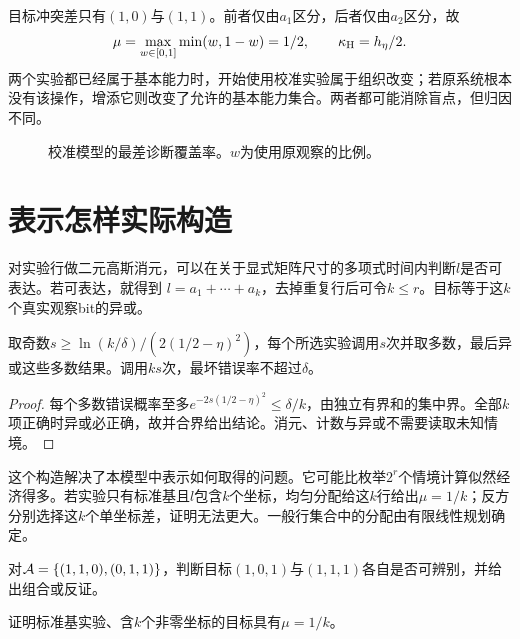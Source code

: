 目标冲突差只有$(1,0)$与$(1,1)$。前者仅由$a_1$区分，后者仅由$a_2$区分，故
\[
 \mu=\max_{w\in[0,1]}\min(w,1-w)=1/2,
 \qquad \kappa_{\mathrm H}=h_\eta/2.
\]
两个实验都已经属于基本能力时，开始使用校准实验属于组织改变；若原系统根本没有该操作，增添它则改变了允许的基本能力集合。两者都可能消除盲点，但归因不同。

\begin{figure}[ht]
\centering
{}
\caption{校准模型的最差诊断覆盖率。$w$为使用原观察的比例。}
\end{figure}

\begin{table}[ht]
\centering

\caption{校准模型在$\delta=0.05$下的解析预算界。下界约束所有策略，上界由公开随机分配实现；二者不表示有限参数下已经达到精确最优。}
\label{tab:calibration}
\end{table}

\section{表示怎样实际构造}
对实验行做二元高斯消元，可以在关于显式矩阵尺寸的多项式时间内判断$l$是否可表达。若可表达，就得到
$l=a_1+\cdots+a_k$，去掉重复行后可令$k\le r$。目标等于这$k$个真实观察bit的异或。

\begin{proposition}[已构造线性表示的可靠执行]
\label{prop:parity-execute}
取奇数$s\ge\ln(k/\delta)/(2(1/2-\eta)^2)$，每个所选实验调用$s$次并取多数，最后异或这些多数结果。调用$ks$次，最坏错误率不超过$\delta$。
\end{proposition}
\begin{proof}
每个多数错误概率至多$e^{-2s(1/2-\eta)^2}\le\delta/k$，由独立有界和的集中界。全部$k$项正确时异或必正确，故并合界给出结论。消元、计数与异或不需要读取未知情境。
\end{proof}

这个构造解决了本模型中表示如何取得的问题。它可能比枚举$2^r$个情境计算似然经济得多。若实验只有标准基且$l$包含$k$个坐标，均匀分配给这$k$行给出$\mu=1/k$；反方分别选择这$k$个单坐标差，证明无法更大。一般行集合中的分配由有限线性规划确定。

\begin{exercise}对$\mathcal A=\{(1,1,0),(0,1,1)\}$，判断目标$(1,0,1)$与$(1,1,1)$各自是否可辨别，并给出组合或反证。\end{exercise}
\begin{exercise}证明标准基实验、含$k$个非零坐标的目标具有$\mu=1/k$。\end{exercise}
